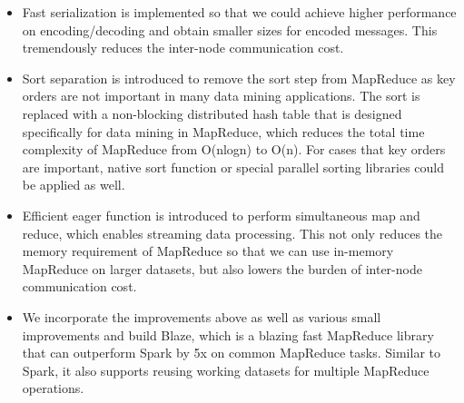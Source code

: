 \begin{itemize}

    \item Fast serialization is implemented so that we could achieve higher performance on encoding/decoding and obtain smaller sizes for encoded messages. This tremendously reduces the inter-node communication cost.
    \item Sort separation is introduced to remove the sort step from MapReduce as key orders are not important in many data mining applications. 
    The sort is replaced with a non-blocking distributed hash table that is designed specifically for data mining in MapReduce, which reduces the total time complexity of MapReduce from O(nlogn) to O(n). 
    For cases that key orders are important, native sort function or special parallel sorting libraries could be applied as well.
    \item Efficient eager function is introduced to perform simultaneous map and reduce, which enables streaming data processing. This not only reduces the memory requirement of MapReduce so that we can use in-memory MapReduce on larger datasets, but also lowers the burden of inter-node communication cost.
    \item We incorporate the improvements above as well as various small improvements and build Blaze, which is a blazing fast MapReduce library that can outperform Spark by 5x on common MapReduce tasks. 
    Similar to Spark, it also supports reusing working datasets for multiple MapReduce operations.
\end{itemize}
